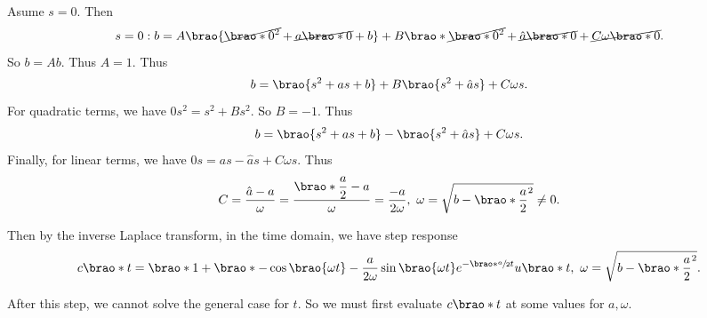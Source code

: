 \documentclass[12pt]{article}
\DeclarePairedDelimiter\brao()%
\begin{document}
\begin{enumerate}[(a)]
        Asume $s = 0$. Then
        \begin{equation}
            s = 0: b = A\brao{\cancel{\brao*0^2} + \cancel{a\brao*0} + b} + B\brao*{\cancel{\brao*0^2} + \cancel{\hat{a}\brao*0}} + \cancel{C\omega \brao*0}.
        \end{equation}
        So $b = Ab$. Thus $A = 1$. Thus
        \begin{equation}
            b = \brao{s^2 + as + b} + B\brao{s^2 + \hat{a}s} + C\omega s.
        \end{equation}
        For quadratic terms, we have $0s^2 = s^2 + Bs^2$. So $B = -1$. Thus
        \begin{equation}
            b = \brao{s^2 + as + b} - \brao{s^2 + \hat{a}s} + C\omega s.
        \end{equation}
        Finally, for linear terms, we have $0s = as - \hat{a}s + C\omega s$. Thus
        \begin{equation}
            C = \frac{\hat{a} - a}\omega
            = \frac{\displaystyle\brao*{\frac{a}2} - a}\omega
            = \frac{-a}{2\omega},\ 
            \omega = \sqrt{b - \brao*{\frac{a}2}^2} \not= 0.
        \end{equation}

        Then by the inverse Laplace transform, in the time domain, we have step response
        \begin{equation}
            \begin{aligned}
                c\brao*t = \brao*{1 + \brao*{-\cos\brao{\omega t} - \frac{a}{2\omega} \sin\brao{\omega t} }{e^{-\brao*{\sfrac{a}2}t}}}u\brao*t,\ 
                \omega = \sqrt{b - \brao*{\frac{a}2}^2}.
            \end{aligned}
        \end{equation}

        After this step, we cannot solve the general case for $t$. So we must first evaluate $c\brao*t$ at some values for $a, \omega$.


\end{enumerate}
\end{document}
